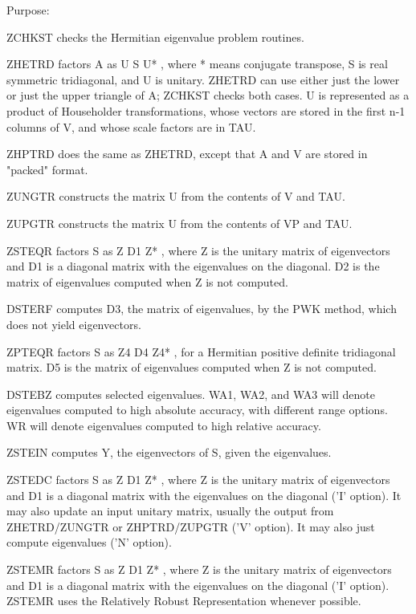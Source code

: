 \begin{DoxyParagraph}{Purpose\+: }
\begin{DoxyVerb} ZCHKST  checks the Hermitian eigenvalue problem routines.

    ZHETRD factors A as  U S U* , where * means conjugate transpose,
    S is real symmetric tridiagonal, and U is unitary.
    ZHETRD can use either just the lower or just the upper triangle
    of A; ZCHKST checks both cases.
    U is represented as a product of Householder
    transformations, whose vectors are stored in the first
    n-1 columns of V, and whose scale factors are in TAU.

    ZHPTRD does the same as ZHETRD, except that A and V are stored
    in "packed" format.

    ZUNGTR constructs the matrix U from the contents of V and TAU.

    ZUPGTR constructs the matrix U from the contents of VP and TAU.

    ZSTEQR factors S as  Z D1 Z* , where Z is the unitary
    matrix of eigenvectors and D1 is a diagonal matrix with
    the eigenvalues on the diagonal.  D2 is the matrix of
    eigenvalues computed when Z is not computed.

    DSTERF computes D3, the matrix of eigenvalues, by the
    PWK method, which does not yield eigenvectors.

    ZPTEQR factors S as  Z4 D4 Z4* , for a
    Hermitian positive definite tridiagonal matrix.
    D5 is the matrix of eigenvalues computed when Z is not
    computed.

    DSTEBZ computes selected eigenvalues.  WA1, WA2, and
    WA3 will denote eigenvalues computed to high
    absolute accuracy, with different range options.
    WR will denote eigenvalues computed to high relative
    accuracy.

    ZSTEIN computes Y, the eigenvectors of S, given the
    eigenvalues.

    ZSTEDC factors S as Z D1 Z* , where Z is the unitary
    matrix of eigenvectors and D1 is a diagonal matrix with
    the eigenvalues on the diagonal ('I' option). It may also
    update an input unitary matrix, usually the output
    from ZHETRD/ZUNGTR or ZHPTRD/ZUPGTR ('V' option). It may
    also just compute eigenvalues ('N' option).

    ZSTEMR factors S as Z D1 Z* , where Z is the unitary
    matrix of eigenvectors and D1 is a diagonal matrix with
    the eigenvalues on the diagonal ('I' option).  ZSTEMR
    uses the Relatively Robust Representation whenever possible.


\end{DoxyVerb}
\end{DoxyParagraph}
